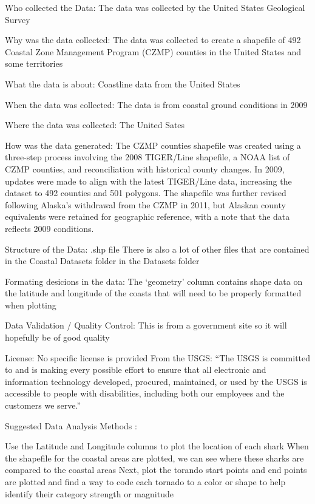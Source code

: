 \documentclass[
  letterpaper,
  DIV=11,
  numbers=noendperiod]{scrreprt}
\begin{document}
Who collected the Data: The data was collected by the United States
Geological Survey

Why was the data collected: The data was collected to create a shapefile
of 492 Coastal Zone Management Program (CZMP) counties in the United
States and some territories

What the data is about: Coastline data from the United States

When the data was collected: The data is from coastal ground conditions
in 2009

Where the data was collected: The United Sates

How was the data generated: The CZMP counties shapefile was created
using a three-step process involving the 2008 TIGER/Line shapefile, a
NOAA list of CZMP counties, and reconciliation with historical county
changes. In 2009, updates were made to align with the latest TIGER/Line
data, increasing the dataset to 492 counties and 501 polygons. The
shapefile was further revised following Alaska's withdrawal from the
CZMP in 2011, but Alaskan county equivalents were retained for
geographic reference, with a note that the data reflects 2009
conditions.

Structure of the Data: .shp file There is also a lot of other files that
are contained in the Coastal Datasets folder in the Datasets folder

Formating desicions in the data: The `geometry' column contains shape
data on the latitude and longitude of the coasts that will need to be
properly formatted when plotting

Data Validation / Quality Control: This is from a government site so it
will hopefully be of good quality

License: No specific license is provided From the USGS: ``The USGS is
committed to and is making every possible effort to ensure that all
electronic and information technology developed, procured, maintained,
or used by the USGS is accessible to people with disabilities, including
both our employees and the customers we serve.''

Suggested Data Analysis Methods :

Use the Latitude and Longitude columns to plot the location of each
shark When the shapefile for the coastal areas are plotted, we can see
where these sharks are compared to the coastal areas Next, plot the
torando start points and end points are plotted and find a way to code
each tornado to a color or shape to help identify their category
strength or magnitude
\end{document}
